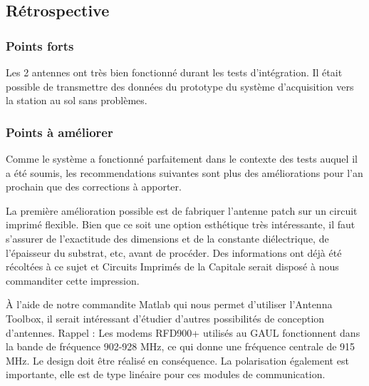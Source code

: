\subsection{Rétrospective}

\subsubsection{Points forts}

Les 2 antennes ont très bien fonctionné durant les tests d'intégration. Il
était possible de transmettre des données du prototype du système d'acquisition
vers la station au sol sans problèmes.

\subsubsection{Points à améliorer}

Comme le système a fonctionné parfaitement dans le contexte des tests auquel il
a été soumis, les recommendations suivantes sont plus des améliorations pour
l'an prochain que des corrections à apporter.
\par
La première amélioration possible est de fabriquer l'antenne patch sur un
circuit imprimé flexible. Bien que ce soit une option esthétique très
intéressante, il faut s'assurer de l'exactitude des dimensions et de la
constante diélectrique, de l'épaisseur du substrat, etc, avant de procéder. Des
informations ont déjà été récoltées à ce sujet et Circuits Imprimés de la
Capitale serait disposé à nous commanditer cette impression.
\par
À l'aide de notre commandite Matlab qui nous permet d'utiliser l'Antenna
Toolbox, il serait intéressant d'étudier d'autres possibilités de conception
d'antennes. Rappel : Les modems RFD900+ utilisés au GAUL fonctionnent dans la
bande de fréquence 902-928 MHz, ce qui donne une fréquence centrale de 915 MHz.
Le design doit être réalisé en conséquence. La polarisation également est
importante, elle est de type linéaire pour ces modules de communication.
